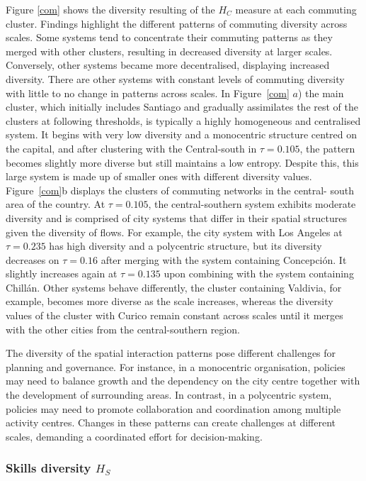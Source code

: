 \documentclass[11pt, a4paper]{article}
\begin{document}
Figure \ref{com} shows the diversity resulting of the $H_{C}$ measure at each commuting cluster. Findings highlight the different patterns of commuting diversity across scales. Some systems tend to concentrate their commuting patterns as they merged with other clusters, resulting in decreased diversity at larger scales. Conversely, other systems became more decentralised, displaying increased diversity. There are other systems with constant levels of commuting diversity with little to no change in patterns across scales. In Figure~\ref{com} $a$) the main cluster, which initially includes Santiago and gradually assimilates the rest of the clusters at following thresholds, is typically a highly homogeneous and centralised system. It begins with very low diversity and a monocentric structure centred on the capital, and after clustering with the Central-south in $\tau =0.105$, the pattern becomes slightly more diverse but still maintains a low entropy. Despite this, this large system is made up of smaller ones with different diversity values. Figure~\ref{com}b displays the clusters of commuting networks in the central- south area of the country. At $\tau = 0.105$, the central-southern system exhibits moderate diversity and is comprised of city systems that differ in their spatial structures given the diversity of flows. For example, the city system with Los Angeles at $\tau = 0.235$ has high diversity and a polycentric structure, but its diversity decreases on $\tau = 0.16$ after merging with the system containing Concepci\'on. It slightly increases again at $\tau = 0.135$ upon combining with the system containing Chill\' an. Other systems behave differently, the cluster containing  Valdivia, for example, becomes more diverse as the scale increases, whereas the diversity values of the cluster with Curico remain constant across scales until it merges with the other cities from the central-southern region.


The diversity of the spatial interaction patterns pose different challenges for planning and governance. For instance, in a monocentric organisation, policies may need to balance growth and the dependency on the city centre together with the development of surrounding areas. In contrast, in a polycentric system, policies may need to promote collaboration and coordination among multiple activity centres. Changes in these patterns can create challenges at different scales, demanding a coordinated effort for decision-making.

\subsubsection{Skills diversity $H_{S}$}
\end{document}

